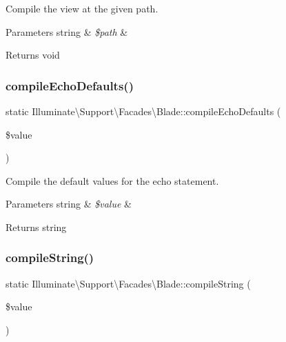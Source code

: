 Compile the view at the given path.


\begin{DoxyParams}[1]{Parameters}
string & {\em \$path} & \\
\hline
\end{DoxyParams}
\begin{DoxyReturn}{Returns}
void 
\end{DoxyReturn}
\mbox{\label{class_illuminate_1_1_support_1_1_facades_1_1_blade_a97fb22faf14e93f58b47796b199955ea}} 
\subsubsection{\texorpdfstring{compile\+Echo\+Defaults()}{compileEchoDefaults()}}
{\footnotesize\ttfamily static Illuminate\textbackslash{}\+Support\textbackslash{}\+Facades\textbackslash{}\+Blade\+::compile\+Echo\+Defaults (\begin{DoxyParamCaption}\item[{}]{\$value }\end{DoxyParamCaption})\hspace{0.3cm}{\ttfamily [static]}}

Compile the default values for the echo statement.


\begin{DoxyParams}[1]{Parameters}
string & {\em \$value} & \\
\hline
\end{DoxyParams}
\begin{DoxyReturn}{Returns}
string 
\end{DoxyReturn}
\mbox{\label{class_illuminate_1_1_support_1_1_facades_1_1_blade_ace0d9e04307ea31f761025a62b3e3155}} 
\subsubsection{\texorpdfstring{compile\+String()}{compileString()}}
{\footnotesize\ttfamily static Illuminate\textbackslash{}\+Support\textbackslash{}\+Facades\textbackslash{}\+Blade\+::compile\+String (\begin{DoxyParamCaption}\item[{}]{\$value }\end{DoxyParamCaption})\hspace{0.3cm}{\ttfamily [static]}}

